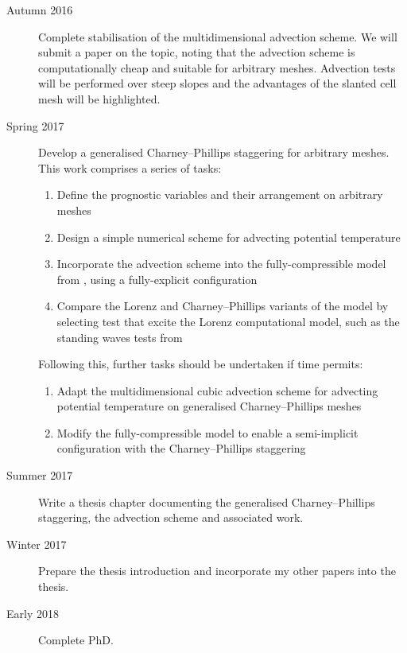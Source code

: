 \documentclass[a4paper,11pt]{article}
\begin{document}
\begin{description}
\item[Autumn 2016]{Complete stabilisation of the multidimensional advection scheme.  We will submit a paper on the topic, noting that the advection scheme is computationally cheap and suitable for arbitrary meshes.  Advection tests will be performed over steep slopes and the advantages of the slanted cell mesh will be highlighted.}
%
\item[Spring 2017]{Develop a generalised Charney--Phillips staggering for arbitrary meshes.
This work comprises a series of tasks:
\begin{enumerate}
\item Define the prognostic variables and their arrangement on arbitrary meshes
\item Design a simple numerical scheme for advecting potential temperature
\item Incorporate the advection scheme into the fully-compressible model from \citet{weller-shahrokhi2014}, using a fully-explicit configuration
\item Compare the Lorenz and Charney--Phillips variants of the model by selecting test that excite the Lorenz computational model, such as the standing waves tests from \citet{arakawa-konor1996}
\end{enumerate}
Following this, further tasks should be undertaken if time permits:
\begin{enumerate}[resume]
\item Adapt the multidimensional cubic advection scheme for advecting potential temperature on generalised Charney--Phillips meshes
\item Modify the fully-compressible model to enable a semi-implicit configuration with the Charney--Phillips staggering
\end{enumerate}
}
\item[Summer 2017]{Write a thesis chapter documenting the generalised Charney--Phillips staggering, the advection scheme and associated work.}
\item[Winter 2017]{Prepare the thesis introduction and incorporate my other papers into the thesis.}
\item[Early 2018]{Complete PhD.}
\end{description}
\end{document}
